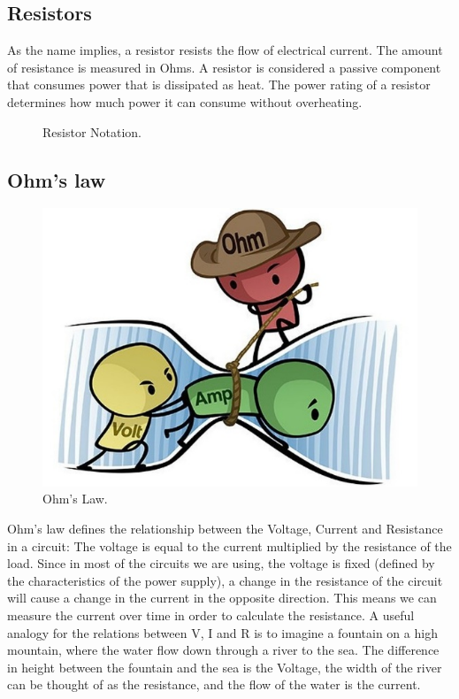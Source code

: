 \subsection{Resistors}
As the name implies, a resistor resists the flow of electrical current. The amount of resistance is measured in Ohms. A resistor is considered a passive component that consumes power that is dissipated as heat. The power rating of a resistor determines how much power it can consume without overheating.
\begin{figure}[h]
    \centering
    
    \caption{Resistor Notation.} \label{fig:resistor}
\end{figure}
\newline
\subsection{ Ohm's law}
\begin{figure}[h]
	\centering
	\includegraphics{images/ohms_law_cartoon.png}
	\caption{Ohm's Law.} \label{fig:ohms_law_cartoon}
\end{figure}
Ohm's law defines the relationship between the Voltage, Current and Resistance in a circuit: The voltage is equal to the current multiplied by the resistance of the load. Since in most of the circuits we are using, the voltage is fixed (defined by the characteristics of the power supply), a change in the resistance of the circuit will cause a change in the current in the opposite direction. This means we can measure the current over time in order to calculate the resistance.
A useful analogy for the relations between V, I and R is to imagine a fountain on a high mountain, where the water flow down through a river to the sea. The difference in height between the fountain and the sea is the Voltage, the width of the river can be thought of as the resistance, and the flow of the water is the current.
